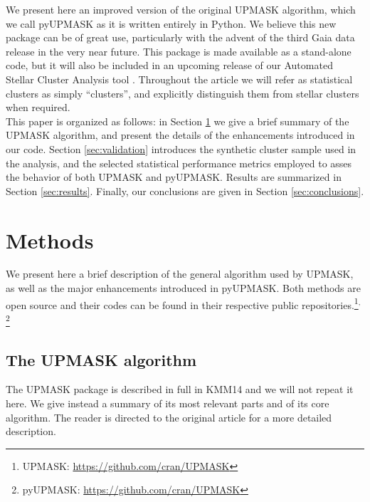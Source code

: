 \documentclass{aa}
\begin{document}
 We present here an improved version of the original UPMASK algorithm, which we
 call pyUPMASK as it is written entirely in Python. We believe this new package
 can be of great use, particularly with the advent of the third Gaia data
 release in the very near future. This package is made available as a
 stand-alone code, but it will also be included in an upcoming release of our
 Automated Stellar Cluster Analysis tool \citep[\texttt{ASteCA};][]{Perren_2015}.
 Throughout the article we will refer as statistical clusters as simply
 ``clusters'', and explicitly distinguish them from stellar clusters when
 required.\\

 This paper is organized as follows: in Section \ref{sec:methods} we
 give a brief summary of the UPMASK algorithm, and present the details of the
 enhancements introduced in our code. 
 Section \ref{sec:validation} introduces the synthetic cluster sample
 used in the analysis, and the selected statistical performance metrics
 employed to asses the behavior of both UPMASK and pyUPMASK.
 Results are summarized in Section \ref{sec:results}. Finally, our
 conclusions are given in Section \ref{sec:conclusions}.



\section{Methods}
 \label{sec:methods}

 We present here a brief description of the general algorithm used by UPMASK,
 as well as the major enhancements introduced in pyUPMASK.
 Both methods are open source and their codes can be found in their
 respective public repositories.\footnote{UPMASK: 
 \url{https://github.com/cran/UPMASK}}$^{,}$\footnote{pyUPMASK:
 \url{https://github.com/cran/UPMASK}} %



\subsection{The UPMASK algorithm}
 \label{ssec:upmask}

 The UPMASK package is described in full in KMM14 and we will not repeat it
 here. We give instead a summary of its most relevant parts and of its core
 algorithm. The reader is directed to the original article for a more detailed
 description.\\
 
\end{document}
